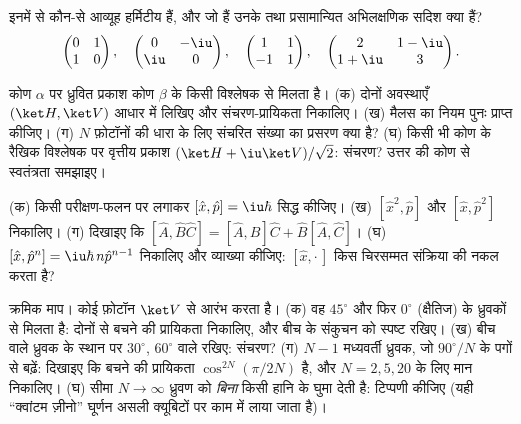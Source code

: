 \begin{exercise}[$\star$]\label{exo:b3:quantum-formalism:2}
इनमें से कौन-से आव्यूह हर्मिटीय हैं, और जो हैं उनके 
तथा प्रसामान्यित अभिलक्षणिक सदिश क्या हैं?
\[
\begin{pmatrix}0 & 1\\ 1 & 0\end{pmatrix} , \quad
\begin{pmatrix}0 & -\iu\\ \iu & 0\end{pmatrix} , \quad
\begin{pmatrix}1 & 1\\ -1 & 1\end{pmatrix} , \quad
\begin{pmatrix}2 & 1-\iu\\ 1+\iu & 3\end{pmatrix} .
\]
\end{exercise}

\begin{exercise}[$\star$]\label{exo:b3:quantum-formalism:3}
कोण $\alpha$ पर ध्रुवित प्रकाश कोण $\beta$ के किसी विश्लेषक से मिलता
है। (क) दोनों अवस्थाएँ $(\ket H, \ket V)$ आधार में लिखिए और
संचरण-प्रायिकता निकालिए। (ख) मैलस का नियम पुनः प्राप्त कीजिए। (ग)
$N$ फ़ोटॉनों की धारा के लिए संचरित संख्या का प्रसरण क्या है? (घ)
किसी भी कोण के रैखिक विश्लेषक पर वृत्तीय प्रकाश $(\ket H + \iu\ket V)/\sqrt2$:
संचरण? उत्तर की कोण से स्वतंत्रता समझाइए।
\end{exercise}

\begin{exercise}[$\star$]\label{exo:b3:quantum-formalism:4}
(क) किसी परीक्षण-फलन पर लगाकर $[\hat x, \hat p] = \iu\hbar$ सिद्ध कीजिए।
(ख) $[\hat x^2, \hat p]$ और $[\hat x, \hat p^2]$ निकालिए। (ग) दिखाइए कि
$[\hat A, \hat B\hat C] = [\hat A, \hat B]\hat C + \hat B[\hat A,
\hat C]$। (घ) $[\hat x, \hat p^n] = \iu\hbar\,n\hat p^{n-1}$ निकालिए
और व्याख्या कीजिए: $[\hat x, \cdot\,]$ किस चिरसम्मत संक्रिया की नकल
करता है?
\end{exercise}

\begin{exercise}[$\star\star$]\label{exo:b3:quantum-formalism:5}
क्रमिक माप। कोई फ़ोटॉन $\ket V$ से आरंभ करता है। (क) वह
$45^\circ$ और फिर $0^\circ$ (क्षैतिज) के ध्रुवकों से मिलता है: दोनों
से बचने की प्रायिकता निकालिए, और बीच के संकुचन को स्पष्ट रखिए। (ख)
बीच वाले ध्रुवक के स्थान पर $30^\circ$,
$60^\circ$ वाले रखिए: संचरण? (ग) $N - 1$ मध्यवर्ती ध्रुवक, जो
$90^\circ/N$ के पगों से बढ़ें: दिखाइए कि बचने की प्रायिकता
$\cos^{2N}(\pi/2N)$ है, और $N = 2, 5, 20$ के लिए मान निकालिए। (घ)
सीमा $N \to \infty$ ध्रुवण को \emph{बिना} किसी हानि के घुमा देती है:
टिप्पणी कीजिए (यही ``क्वांटम ज़ीनो'' घूर्णन असली क्यूबिटों पर काम में लाया जाता है)।
\end{exercise}

